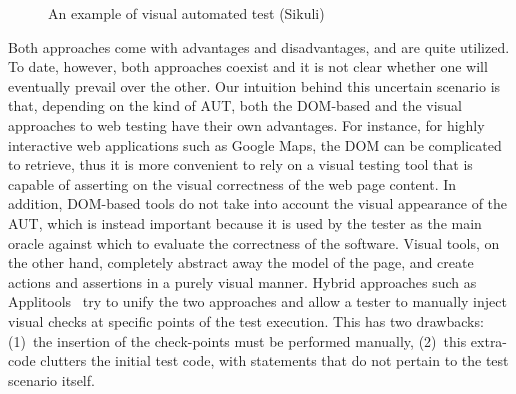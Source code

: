 \begin{figure}[b]
\centering
{}
\caption{An example of visual automated test (Sikuli)}
\label{fig:visual}
\end{figure}

Both approaches come with advantages and disadvantages, and are quite utilized. %
To date, however, both approaches coexist and it is not clear whether one will eventually prevail over the other. Our intuition behind this uncertain scenario is that, depending on the kind of AUT, both the DOM-based and the visual approaches to web testing have their own advantages. For instance, for highly interactive web applications such as Google Maps, the DOM can be complicated to retrieve, thus it is more convenient to rely on a visual testing tool that is capable of asserting on the visual correctness of the web page content.
In addition, DOM-based tools do not take into account the visual appearance of the AUT, which is instead important because it is used by the tester as the main oracle against which to evaluate the correctness of the software. Visual tools, on the other hand, completely abstract away the model of the page, and create actions and assertions in a purely visual manner. 
%
Hybrid approaches such as Applitools~\cite{applitools} try to unify the two approaches and allow a tester to manually inject visual checks at specific points of the test execution. This has two drawbacks: (1)~the insertion of the check-points must be performed manually, (2)~this extra-code clutters the initial test code, with statements that do not pertain to the test scenario itself.

